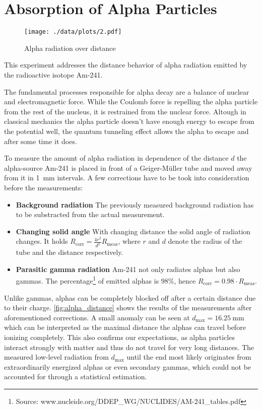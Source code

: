 \chapter{Absorption of Alpha Particles}
\begin{figure}[ht!]
	\centering
	\texttt{[image: ./data/plots/2.pdf]}
	\caption[Alpha radiation over distance]{Alpha radiation over distance}
	\label{fig:alpha_distance}
\end{figure}

This experiment addresses the distance behavior of alpha radiation emitted by the radioactive isotope Am-241.

The fundamental processes responsible for alpha decay are a balance of nuclear and electromagnetic force.
While the Coulomb force is repelling the alpha particle from the rest of the nucleus, it is restrained from the nuclear force.
Altough in classical mechanics the alpha particle doesn't have enough energy to escape from the potential well, the quantum tunneling effect allows the alpha to escape and after some time it does.

To measure the amount of alpha radiation in dependence of the distance $d$ the alpha-source Am-241 is placed in front of a Geiger-Müller tube and moved away from it in \SI{1}{\milli\meter} intervals.
A few corrections have to be took into consideration before the measurements:
\begin{itemize}
	\item \textbf{Background radiation} The previously measured background radiation has to be substracted from the actual measurement.
	\item \textbf{Changing solid angle} With changing distance the solid angle of radiation changes. It holds $R_\text{corr}=\frac{4r^2}{d^2}R_\text{meas}$, where $r$ and $d$ denote the radius of the tube and the distance respectively.
	\item \textbf{Parasitic gamma radiation} Am-241 not only radiates alphas but also gammas. The percentage\footnote{Source: www.nucleide.org/DDEP\_WG/NUCLIDES/AM-241\_tables.pdf} of emitted alphas is $\num{98}\%$, hence $R_\text{corr}=0.98\cdot R_\text{meas}$.
\end{itemize}

Unlike gammas, alphas can be completely blocked off after a certain distance due to their charge.
\autoref{fig:alpha_distance} shows the results of the measurements after aforementioned corrections.
A small anomaly can be seen at $d_\text{max}=\SI{16.25}{\milli\meter}$ which can be interpreted as the maximal distance the alphas can travel before ionizing completely.
This also confirms our expectations, as alpha particles interact strongly with matter and thus do not travel for very long distances.
The measured low-level radiation from $d_\text{max}$ until the end most likely originates from extraordinarily energized alphas or even secondary gammas, which could not be accounted for through a statistical estimation.

